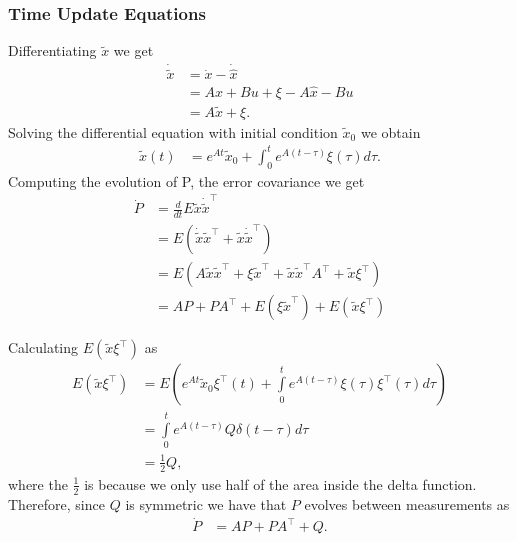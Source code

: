 \subsubsection{Time Update Equations}
Differentiating \begin{math} \tilde{x} \end{math} we get
\begin{align*}
\dot{\tilde{x}}&= \dot{x}-\dot{\hat{x}} \\
			   &= Ax+Bu+\xi - A\hat{x}-Bu\\
			   &= A\tilde{x}+\xi.
\end{align*}
Solving the differential equation with initial condition \begin{math} \tilde{x}_0 \end{math} we obtain
\begin{align*}
\tilde{x}(t) &= e^{At}\tilde{x}_0+\int_{0}^{t}e^{A(t-\tau)}\xi(\tau)d\tau.
\end{align*}
Computing the evolution of P, the error covariance we get
\begin{align*}
\dot{P}&= \frac{d}{dt}E{\tilde{x}\dot{\tilde{x}}^\top} \\
	   &= E(\dot{\tilde{x}}\tilde{x}^\top+\tilde{x}\dot{\tilde{x}}^\top) \\
	   &= E (A\tilde{x}\tilde{x}^\top + \xi\tilde{x}^\top+\tilde{x}\tilde{x}^\top A^\top+\tilde{x}\xi^\top) \\
	   &= AP + PA^\top +E(\xi\tilde{x}^\top)+E(\tilde{x}\xi^\top)
\end{align*}

Calculating \begin{math} E(\tilde{x}\xi^\top)  \end{math} as
\begin{align*}
E(\tilde{x}\xi^\top)&= E(e^{At}\tilde{x}_0\xi^\top (t)+\int\limits_{0}^{t}e^{A(t-\tau)}\xi(\tau)\xi^\top (\tau)d\tau)\\
					&= \int\limits_{0}^{t}e^{A(t-\tau)}Q\delta(t-\tau)d\tau \\
					&= \frac{1}{2}Q,
\end{align*}
where the \begin{math} \frac{1}{2} \end{math} is because we only use half of the area inside the delta function. Therefore, since \begin{math} Q \end{math} is symmetric we have that \begin{math} P \end{math} evolves between measurements as
\begin{align*}
\dot{P}&=AP+PA^\top +Q.
\end{align*}

